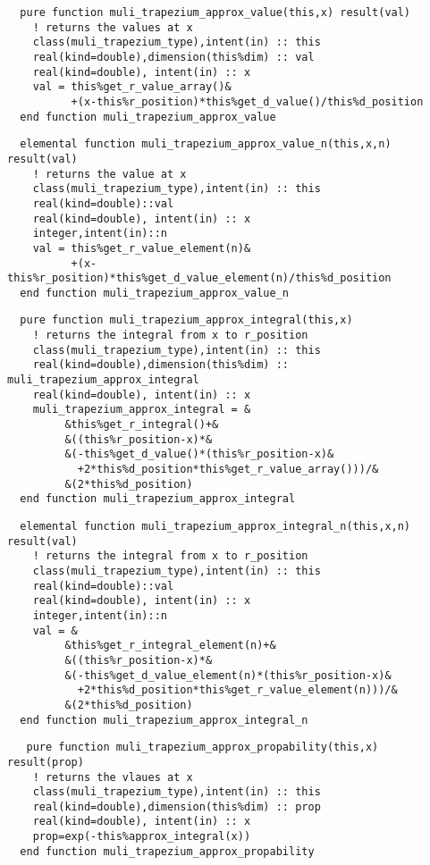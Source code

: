 \begin{Verbatim}
  pure function muli_trapezium_approx_value(this,x) result(val)
    ! returns the values at x
    class(muli_trapezium_type),intent(in) :: this
    real(kind=double),dimension(this%dim) :: val
    real(kind=double), intent(in) :: x
    val = this%get_r_value_array()&
          +(x-this%r_position)*this%get_d_value()/this%d_position
  end function muli_trapezium_approx_value
\end{Verbatim}
\begin{Verbatim}
  elemental function muli_trapezium_approx_value_n(this,x,n) result(val)
    ! returns the value at x
    class(muli_trapezium_type),intent(in) :: this
    real(kind=double)::val
    real(kind=double), intent(in) :: x
    integer,intent(in)::n
    val = this%get_r_value_element(n)&
          +(x-this%r_position)*this%get_d_value_element(n)/this%d_position
  end function muli_trapezium_approx_value_n
\end{Verbatim}
\begin{Verbatim}
  pure function muli_trapezium_approx_integral(this,x)
    ! returns the integral from x to r_position
    class(muli_trapezium_type),intent(in) :: this
    real(kind=double),dimension(this%dim) :: muli_trapezium_approx_integral
    real(kind=double), intent(in) :: x
    muli_trapezium_approx_integral = &
         &this%get_r_integral()+&
         &((this%r_position-x)*&
         &(-this%get_d_value()*(this%r_position-x)&
           +2*this%d_position*this%get_r_value_array()))/&
         &(2*this%d_position)
  end function muli_trapezium_approx_integral
\end{Verbatim}

\begin{Verbatim}
  elemental function muli_trapezium_approx_integral_n(this,x,n) result(val)
    ! returns the integral from x to r_position
    class(muli_trapezium_type),intent(in) :: this
    real(kind=double)::val
    real(kind=double), intent(in) :: x
    integer,intent(in)::n
    val = &
         &this%get_r_integral_element(n)+&
         &((this%r_position-x)*&
         &(-this%get_d_value_element(n)*(this%r_position-x)&
           +2*this%d_position*this%get_r_value_element(n)))/&
         &(2*this%d_position)
  end function muli_trapezium_approx_integral_n
\end{Verbatim}

\begin{Verbatim}
   pure function muli_trapezium_approx_propability(this,x) result(prop)
    ! returns the vlaues at x
    class(muli_trapezium_type),intent(in) :: this
    real(kind=double),dimension(this%dim) :: prop
    real(kind=double), intent(in) :: x
    prop=exp(-this%approx_integral(x))
  end function muli_trapezium_approx_propability
\end{Verbatim}

